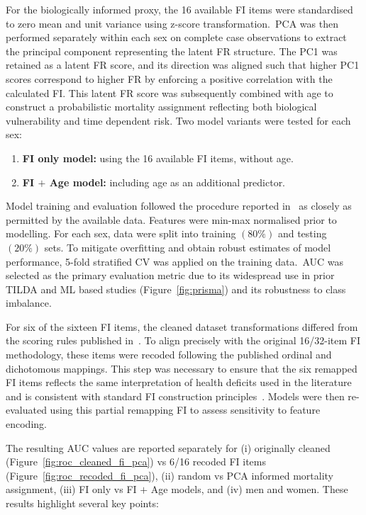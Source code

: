 For the biologically informed proxy, the 16 available \gls{FI} items were standardised to zero mean and unit variance using z-score transformation.\ \gls{PCA} was then performed separately within each sex on complete case observations to extract the principal component representing the latent \gls{FR} structure. The \gls{PC1} was retained as a latent \gls{FR} score, and its direction was aligned such that higher \gls{PC1} scores correspond to higher \gls{FR} by enforcing a positive correlation with the calculated \gls{FI}. This latent \gls{FR} score was subsequently combined with age to construct a probabilistic mortality assignment reflecting both biological vulnerability and time dependent risk. Two model variants were tested for each sex:
\begin{enumerate}
    \item \textbf{\gls{FI} only model:} using the 16 available \gls{FI} items, without age.
    \item \textbf{\gls{FI} $+$ Age model:} including age as an additional predictor.
\end{enumerate}
Model training and evaluation followed the procedure reported in~\cite{moguilnerImportanceAgePrediction2021} as closely as permitted by the available data. Features were min-max normalised prior to modelling. For each sex, data were split into training $(80\%)$ and testing $(20\%)$ sets. To mitigate overfitting and obtain robust estimates of model performance, 5-fold stratified \gls{CV} was applied on the training data.\ \gls{AUC} was selected as the primary evaluation metric due to its widespread use in prior \gls{TILDA} and \gls{ML} based studies (Figure~\ref{fig:prisma}) and its robustness to class imbalance.

For six of the sixteen \gls{FI} items, the cleaned dataset transformations differed from the scoring rules published in~\cite{moguilnerImportanceAgePrediction2021}. To align precisely with the original 16/32-item \gls{FI} methodology, these items were recoded following the published ordinal and dichotomous mappings. This step was necessary to ensure that the six remapped \gls{FI} items reflects the same interpretation of health deficits used in the literature and is consistent with standard \gls{FI} construction principles~\cite{searleStandardProcedureCreating2008}. Models were then re-evaluated using this partial remapping \gls{FI} to assess sensitivity to feature encoding.

The resulting \gls{AUC} values are reported separately for (i) originally cleaned (Figure~\ref{fig:roc_cleaned_fi_pca}) vs 6/16 recoded \gls{FI} items (Figure~\ref{fig:roc_recoded_fi_pca}), (ii) random vs \gls{PCA} informed mortality assignment, (iii) \gls{FI} only vs \gls{FI} $+$ Age models, and (iv) men and women. These results highlight several key points:

